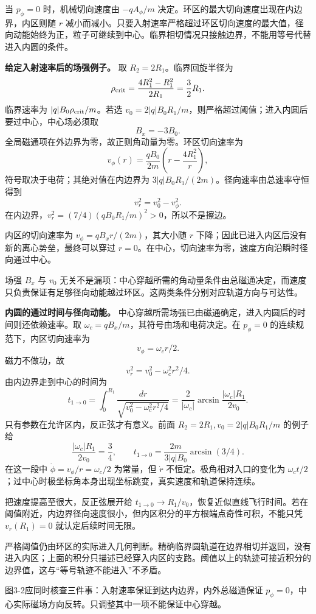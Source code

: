 \documentclass[12pt,a4paper,UTF8]{ctexart}
\begin{document}
当 \(p_\phi=0\) 时，机械切向速度由 \(-qA_\phi/m\)
决定。环区的最大切向速度出现在内边界，内区则随 \(r\)
减小而减小。只要入射速率严格超过环区切向速度的最大值，径向动能始终为正，粒子可继续到中心。临界相切情况只接触边界，不能用等号代替进入内圆的条件。

\textbf{给定入射速率后的场强例子。} 取 \(R_2=2R_1\)。临界回旋半径为 \[
\rho_{\rm crit}=\frac{4R_1^2-R_1^2}{2R_1}=\frac32R_1.
\] 临界速率为 \(|q|B_0\rho_{\rm crit}/m\)。若选
\(v_0=2|q|B_0R_1/m\)，则严格超过阈值；进入内圆后要过中心，中心场必须取
\[
B_x=-3B_0.
\] 全局磁通项在外边界为零，故正则角动量为零。环区切向速率为 \[
v_\phi(r)=\frac{qB_0}{2m}\left(r-\frac{4R_1^2}{r}\right),
\] 符号取决于电荷；其绝对值在内边界为
\(3|q|B_0R_1/(2m)\)。径向速率由总速率守恒得到 \[
v_r^2=v_0^2-v_\phi^2.
\] 在内边界，\(v_r^2=(7/4)(qB_0R_1/m)^2>0\)，所以不是擦边。

内区的切向速率为 \(v_\phi=qB_xr/(2m)\)，其大小随 \(r\)
下降；因此已进入内区后没有新的离心势垒，最终可以穿过
\(r=0\)。在中心，切向速率为零，速度方向沿瞬时径向通过中心。

场强 \(B_x\) 与 \(v_0\)
无关不是漏项：中心穿越所需的角动量条件由总磁通决定，而速度只负责保证有足够径向动能越过环区。这两类条件分别对应轨道方向与可达性。

\textbf{内圆的通过时间与径向动能。}
中心穿越所需场强已由磁通确定，进入内圆后的时间则还依赖速率。取
\(\omega_c=qB_x/m\)，其符号由场和电荷决定。在 \(p_\phi=0\)
的连续规范下，内区切向速率为 \[
v_\phi=\omega_c r/2.
\] 磁力不做功，故 \[
v_r^2=v_0^2-\omega_c^2r^2/4.
\] 由内边界走到中心的时间为 \[
t_{1\to0}=\int_0^{R_1}\frac{dr}{\sqrt{v_0^2-\omega_c^2r^2/4}}
=\frac2{|\omega_c|}\arcsin\frac{|\omega_c|R_1}{2v_0}.
\] 只有参数在允许区内，反正弦才有意义。前面
\(R_2=2R_1,v_0=2|q|B_0R_1/m\) 的例子给 \[
\frac{|\omega_c|R_1}{2v_0}=\frac34,
\qquad t_{1\to0}=\frac{2m}{3|q|B_0}\arcsin(3/4).
\] 在这一段中 \(\dot\phi=v_\phi/r=\omega_c/2\) 为常量，但 \(\dot r\)
不恒定。极角相对入口的变化为
\(\omega_ct/2\)；过中心时极坐标角本身出现坐标跳变，真实速度和轨道保持连续。

把速度提高至很大，反正弦展开给
\(t_{1\to0}\to R_1/v_0\)，恢复近似直线飞行时间。若在阈值附近，内边界径向速度很小，但内区积分的平方根端点奇性可积，不能只凭
\(v_r(R_1)=0\) 就认定后续时间无限。

严格阈值仍由环区的实际进入几何判断。精确临界圆轨道在边界相切并返回，没有进入内区；上面的积分只描述已经穿入内区的支路。阈值以上的轨迹可接近积分的边界值，这与``等号轨迹不能进入''不矛盾。

图3-2应同时核查三件事：入射速率保证到达内边界，内外总磁通保证
\(p_\phi=0\)，中心实际磁场方向反转。只调整其中一项不能保证中心穿越。
\end{document}
